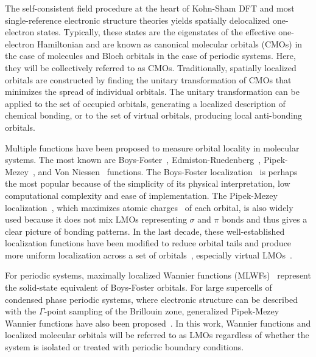 \documentclass[aps,prl,reprint,amsmath,amssymb]{revtex4-1}
\begin{document}
The self-consistent field procedure at the heart of Kohn-Sham DFT and most single-reference electronic structure theories yields spatially delocalized one-electron states. Typically, these states are the eigenstates of the effective one-electron Hamiltonian and are known as canonical molecular orbitals (CMOs) in the case of molecules and Bloch orbitals in the case of periodic systems. Here, they will be collectively referred to as CMOs. 
Traditionally, spatially localized orbitals are constructed by finding the unitary transformation of CMOs that minimizes the spread of individual orbitals. 
The unitary transformation can be applied to the set of occupied orbitals, generating a localized description of chemical bonding, or to the set of virtual orbitals, producing local anti-bonding orbitals. 

Multiple functions have been proposed to measure orbital locality in molecular systems. The most known are Boys-Foster~\cite{boys1960construction}, Edmiston-Ruedenberg~\cite{bytautas2002electron, bytautas2003split, edmiston1963localized}, Pipek-Mezey~\cite{pipek1989fast}, and Von Niessen~\cite{niessen1972density} functions. 
The Boys-Foster localization~\cite{boys1960construction} is perhaps the most popular because of the simplicity of its physical interpretation, low computational complexity and ease of implementation. 
The Pipek-Mezey localization~\cite{pipek1989fast}, which maximizes atomic charges~\cite{mulliken1955electronic, lowdin1950non, lehtola2014pipek} of each orbital, is also widely used because it does not mix LMOs representing $\sigma$ and $\pi$ bonds and thus gives a clear picture of bonding patterns. 
In the last decade, these well-established localization functions have been modified to reduce orbital tails and produce more uniform localization across a set of orbitals~\cite{jansik2011local, hoyvik2012orbital, hoyvik2012trust, hoyvik2013pipek, lehtola2013unitary, lehtola2014pipek}, especially virtual LMOs~\cite{jansik2011local, hoyvik2012orbital}.

For periodic systems, maximally localized Wannier functions (MLWFs)~\cite{marzari2012maximally,marzari1997maximally} represent the solid-state equivalent of Boys-Foster orbitals. 
For large supercells of condensed phase periodic systems, where electronic structure can be described with the $\Gamma$-point sampling of the Brillouin zone, generalized Pipek-Mezey Wannier functions have also been proposed~\cite{jonsson2017theory}. 
In this work, Wannier functions and localized molecular orbitals will be referred to as LMOs regardless of whether the system is isolated or treated with periodic boundary conditions.
 
\end{document}
